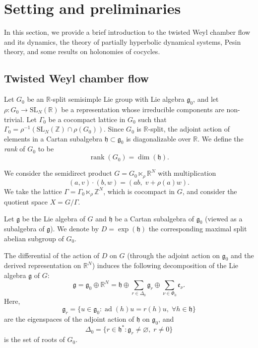 \documentclass[11pt]{amsart}
\numberwithin{equation}{section}
\theoremstyle{plain}
\begin{document}
\section{Setting and preliminaries}\label{prelim}
In this section, we provide a brief introduction to the twisted Weyl chamber flow and its dynamics, the theory of partially hyperbolic dynamical systems, Pesin theory, and some results on holonomies of cocycles.

\subsection{Twisted Weyl chamber flow}\label{semisimple}

Let $G_0$ be an $\mathbb{R}$-split semisimple Lie group with Lie algebra $\mathfrak{g}_0$, and let $\rho:G_0\to \mathrm{SL}_N(\mathbb{R})$ be a representation whose irreducible components are non-trivial. Let $\Gamma_0$ be a cocompact lattice in $G_0$ such that $\Gamma_0 = \rho^{-1}(\mathrm{SL}_N(\mathbb{Z}) \cap \rho(G_0))$. Since $G_0$ is $\mathbb{R}$-split, the adjoint action of elements in a Cartan subalgebra $\mathfrak{h} \subset \mathfrak{g}_0$ is diagonalizable over $\mathbb{R}$. We define the \emph{rank} of $G_0$ to be
\[
\operatorname{rank}(G_0) = \dim (\mathfrak{h}).
\]

We consider the semidirect product $G = G_0 \ltimes_\rho \mathbb{R}^N$ with multiplication
\[
(a,v) \cdot (b,w) = (ab, \; v + \rho(a)w).
\]
We take the lattice $\Gamma = \Gamma_0 \ltimes_\rho \mathbb{Z}^N$, which is cocompact in $G$, and consider the quotient space $X = G/\Gamma$.

Let $\mathfrak{g}$ be the Lie algebra of $G$ and $\mathfrak{h}$ be a Cartan subalgebra of $\mathfrak{g}_0$ (viewed as a subalgebra of $\mathfrak{g}$). We denote by $D = \exp(\mathfrak{h})$ the corresponding maximal split abelian subgroup of $G_0$.

The differential of the action of $D$ on $G$ (through the adjoint action on $\mathfrak{g}_0$ and the derived representation on $\mathbb{R}^N$) induces the following decomposition of the Lie algebra $\mathfrak{g}$ of $G$:
\[
\mathfrak{g} = \mathfrak{g}_0 \oplus \mathbb{R}^N = \mathfrak{h} \oplus \sum_{r \in \Delta_0} \mathfrak{g}_r \oplus \sum_{\nu \in \Phi_0} \mathfrak{e}_\nu.
\]
Here, 
\[
\mathfrak{g}_r = \{ u \in \mathfrak{g}_0 : \operatorname{ad}(h)u = r(h)u, \; \forall h \in \mathfrak{h} \}
\]
are the eigenspaces of the adjoint action of $\mathfrak{h}$ on $\mathfrak{g}_0$, and
\[
\Delta_0 = \{ r \in \mathfrak{h}^* : \mathfrak{g}_r \neq \varnothing, \; r \neq 0 \}
\]
is the set of roots of $G_0$. 
\end{document}
